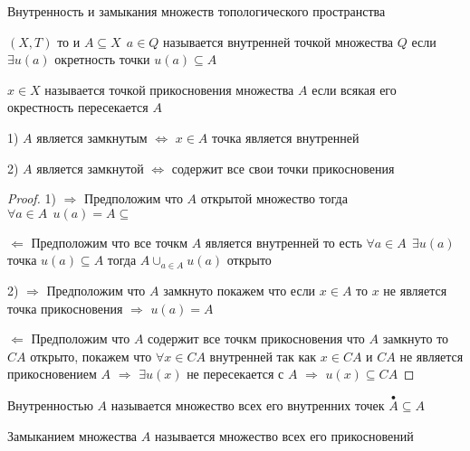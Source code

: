 \begin{title}[\Large]
  Внутренность и замыкания множеств топологического пространства
\end{title}

\begin{define}
  $(X, T)$ то и $A \subseteq X ~~ a \in Q$ называется внутренней точкой
  множества $Q$ если $\exists u(a)$ окретность точки $u(a) \subseteq A$
\end{define}

\begin{define}
  $x \in X$ называется точкой прикосновения множества $A$ если всякая его
  окрестность пересекается $A$
\end{define}

\begin{theorem}
  1) $A$ является замкнутым $\Leftrightarrow$ $x \in A$ точка является
  внутренней

  2) $A$ является замкнутой $\Leftrightarrow$ содержит все свои точки
  прикосновения
\end{theorem}

\begin{proof}
  1) $\Rightarrow$ Предположим что $A$ открытой множество тогда $\forall a \in A
  ~~ u(a) = A \subseteq$

  $\Leftarrow$ Предположим что все точкм $A$ является внутренней то есть
  $\forall a \in A ~~ \exists u(a)$ точка $u(a) \subseteq A$ тогда
  $A \cup_{a \in A} u(a)$ открыто

  2) $\Rightarrow$ Предположим что $A$ замкнуто покажем что если $x \in A$
  то $x$ не является точка прикосновения $\Rightarrow$ $u(a) = A$

  $\Leftarrow$ Предположим что $A$ содержит все точкм прикосновения что $A$
  замкнуто то $CA$ открыто, покажем что $\forall x \in CA$ внутренней так как
  $x \in CA$ и $CA$ не является прикосновением $A$ $\Rightarrow$ $\exists u(x)$
  не пересекается с $A$ $\Rightarrow$ $u(x) \subseteq CA$
\end{proof}

\begin{block}[Следствие]
  Внутренностью $A$ называется множество всех его внутренних точек
  $\stackrel{\bullet}{A} \subseteq A$
\end{block}

\begin{define}[Замыкания]
  Замыканием множества $A$ называется множество всех его прикосновений
\end{define}

